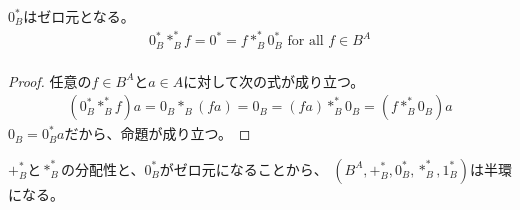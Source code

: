 \begin{proposition}[ゼロ元] %
$0_B^*$はゼロ元となる。
\begin{equation*}\begin{split} %
	0_B^* *_B^* f = 0^* = f *_B^* 0_B^* \text{ for all }f\in B^A \\
\end{split}\end{equation*} %
\end{proposition} %
\begin{proof} %
任意の$f\in B^A$と$a\in A$に対して次の式が成り立つ。
\begin{equation*}\begin{split} %
	(0_B^* *_B^* f)a = 0_B *_B (fa) = 0_B = (fa) *_B^* 0_B = (f *_B^* 0_B)a
\end{split}\end{equation*} %
$0_B = 0_B^* a$だから、命題が成り立つ。
\end{proof} %

$+_B^*$と$*_B^*$の分配性と、$0_B^*$がゼロ元になることから、
$(B^A,+_B^*,0_B^*,*_B^*,1_B^*)$は半環になる。

